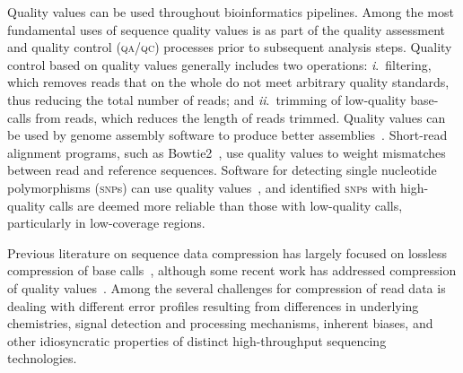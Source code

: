 \documentclass{bmcart}
\begin{document}
Quality values can be used throughout bioinformatics pipelines. Among
the most fundamental uses of sequence quality values is as part of the
quality assessment and quality control (\textsc{qa/qc}) processes
prior to subsequent analysis steps. Quality control based on quality
values generally includes two operations: \textit{i}.~filtering, which
removes reads that on the whole do not meet arbitrary quality
standards, thus reducing the total number of reads; and
\textit{ii}.~trimming of low-quality base-calls from reads, which
reduces the length of reads trimmed. Quality values can be used by
genome assembly software to produce better
assemblies~\cite[e.g.,][]{Bryant:2009uq,Gnerre:2011kx}. Short-read
alignment programs, such as Bowtie2~\cite{Langmead:2012rw}, use
quality values to weight mismatches between read and reference
sequences. Software for detecting single nucleotide polymorphisms
(\textsc{snp}s) can use quality values~\cite[e.g.,][]{McKenna:2010bh},
and identified \textsc{snp}s with high-quality calls are deemed more
reliable than those with low-quality calls, particularly in
low-coverage regions.

Previous literature on sequence data compression has largely focused
on lossless compression of base calls~\cite[reviewed
  in][]{Deorowicz:2013hq, Giancarlo:2009fk,Giancarlo:2014rw,
  Nalbantoglu:2010uq,Zhu:2013qr}, although some recent work has
addressed compression of quality
values~\cite[e.g.,][]{Canovas:2014fr,Hach:2012ys,
  janin2013adaptive,Kozanitis:2011kl,Ochoa:2013rt,Tembe:2010ys,
  Wan:2012kq,DBLP:conf/recomb/YuYB14,zhou2014compression,Malysa01102015}.
Among the several challenges for compression of read data is dealing
with different error profiles resulting from differences in underlying
chemistries, signal detection and processing mechanisms, inherent
biases, and other idiosyncratic properties of distinct high-throughput
sequencing technologies.
\end{document}
